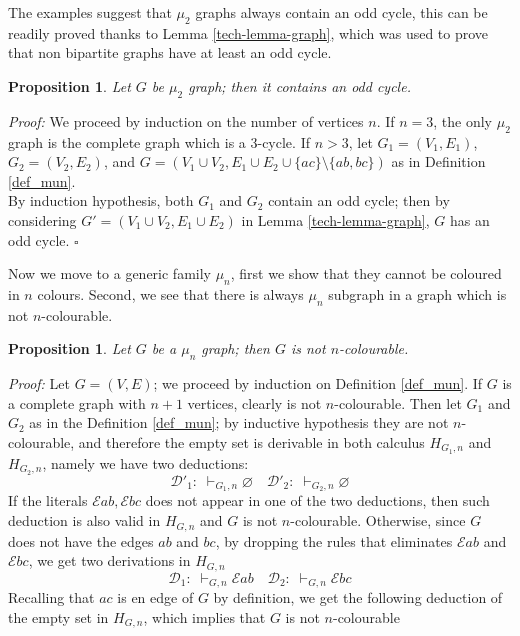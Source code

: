 \documentclass[a4paper,12pt,oneside]{book}
\newtheorem{proposition}[theorem]{Proposition}
\newcommand{\E}{\mathscr{E}}
\newcommand{\D}{\mathscr{D}}
\newcommand*{\QED}{\hfill\ensuremath{\square}}
\let\emptyset\varnothing
\begin{document}
\noindent The examples suggest that $\mu_2$ graphs always contain an odd cycle, this can be readily proved thanks to Lemma  \ref{tech-lemma-graph}, which was used to prove that  non bipartite graphs have at least an odd cycle.
\begin{proposition}\label{contains-odd}
Let $G$ be $\mu_2$ graph; then it contains an odd cycle.
\end{proposition}

\textit{Proof:} 
We proceed by induction on the number of vertices $n$. If $n=3$, the only $\mu_2$ graph is the complete graph which is a 3-cycle. If $n>3$, let $G_1=(V_1,E_1)$, $G_2=(V_2,E_2)$, and $G=(V_1\cup V_2, E_1\cup E_2\cup\{ac\} \setminus\{ab,bc\} )$ as in Definition \ref{def_mun}. 
\\By induction hypothesis, both $G_1$ and $G_2$ contain an odd cycle; then by considering $G'=(V_1\cup V_2, E_1\cup E_2)$ in Lemma \ref{tech-lemma-graph}, $G$ has an odd cycle. \QED


\noindent 
Now we move to a generic family $\mu_n$, first we show that they cannot be coloured in $n$ colours. Second, we see that there is always $\mu_n$ subgraph in a graph which is not $n$-colourable.
\begin{proposition}\label{pr-nocolor}
Let $G$ be a $\mu_n$ graph; then $G$ is not $n$-colourable.
\end{proposition}
\textit{Proof:} 
Let $G=(V,E)$; we proceed by induction on Definition \ref{def_mun}. If $G$ is a complete graph with $n+1$ vertices, clearly is not $n$-colourable. Then let $G_1$ and $G_2$ as in the Definition \ref{def_mun}; by inductive hypothesis they are not  $n$-colourable, and therefore the empty set is derivable in both calculus $H_{G_1,n}$ and $H_{G_2,n}$, namely we have two deductions:
$$
 \D'_1:\; \vdash_{G_1,n} \emptyset  \quad \D'_2:\; \vdash_{G_2,n} \emptyset
$$
If the literals $\E ab, \E bc$ does not appear in one of the two deductions, then such deduction is also valid in $H_{G,n}$ and $G$ is not $n$-colourable.
Otherwise, since $G$ does not have the edges $ab$ and $bc$, by dropping the rules that eliminates $\E ab$ and $\E bc$, we get two derivations in $H_{G,n}$
$$
 \D_1:\; \vdash_{G,n} \E ab  \quad \D_2:\; \vdash_{G,n} \E bc 
$$
Recalling that $ac$ is en edge of $G$ by definition, we get the following deduction of the empty set in $H_{G,n}$, which implies that $G$ is not $n$-colourable

\end{document}
